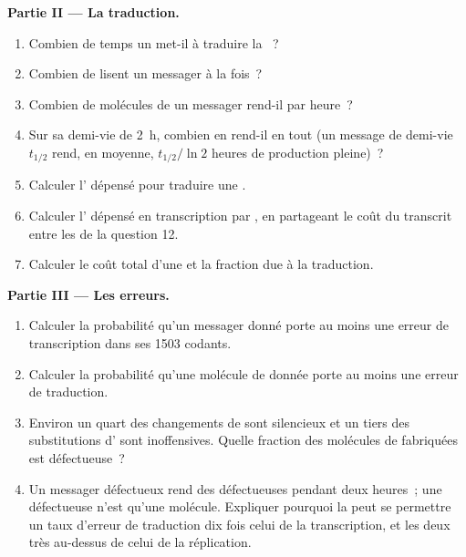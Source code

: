 \begin{problem}
\medskip
\noindent\textbf{Partie II --- La traduction.}
\begin{enumerate}[resume]
  \item Combien de temps un  met-il à traduire la ~?
  \item Combien de  lisent un messager à la fois~?
  \item Combien de molécules de  un messager rend-il par heure~?
  \item Sur sa demi-vie de \qty{2}{h}, combien en rend-il en tout (un
        message de demi-vie $t_{1/2}$ rend, en moyenne,
        $t_{1/2}/\ln 2$ heures de production pleine)~?
  \item Calculer l' dépensé pour traduire une .
  \item Calculer l' dépensé en transcription par , en
        partageant le coût du transcrit entre les  de la
        question 12.
  \item Calculer le coût total d'une  et la fraction due à la
        traduction.
\end{enumerate}

\medskip
\noindent\textbf{Partie III --- Les erreurs.}
\begin{enumerate}[resume]
  \item Calculer la probabilité qu'un messager donné porte au moins une
        erreur de transcription dans ses \qty{1503}{} 
        codants.
  \item Calculer la probabilité qu'une molécule de  donnée porte
        au moins une erreur de traduction.
  \item Environ un quart des changements de  sont silencieux
        et un tiers des substitutions d' sont inoffensives.
        Quelle fraction des molécules de  fabriquées est
        défectueuse~?
  \item Un messager défectueux rend des  défectueuses pendant
        deux heures~; une  défectueuse n'est qu'une molécule.
        Expliquer pourquoi la  peut se permettre un taux d'erreur
        de traduction dix fois celui de la transcription, et les deux
        très au-dessus de celui de la réplication.
\end{enumerate}


\end{problem}
